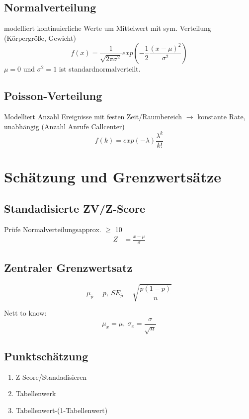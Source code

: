\documentclass[10pt,a4paper,landscape]{article}
\begin{document}
\begin{multicols}{4}
\subsection{Normalverteilung}
modelliert kontinuierliche Werte um Mittelwert mit sym. Verteilung (Körpergröße, Gewicht) \\

\[
f(x)=\frac{1}{\sqrt{2 \pi \sigma^2}}exp\left(-\frac{1}{2}\frac{(x-\mu)^2}{\sigma^2}\right)
\]
$\mu = 0$ und $\sigma^2 = 1$ ist standardnormalverteilt.


\subsection{Poisson-Verteilung}
Modelliert Anzahl Ereignisse mit festen Zeit/Raumbereich $\rightarrow$ konstante Rate, unabhängig (Anzahl Anrufe Callcenter)
\[
f(k)=exp(-\lambda)\frac{\lambda^k}{k!}
\]



\section{Schätzung und Grenzwertsätze}

\subsection{Standadisierte ZV/Z-Score}
Prüfe Normalverteilungsapprox. $\geq$ 10
\begin{align*}
Z &= \frac{x - \mu}{\sigma} 
\end{align*}


\subsection{Zentraler Grenzwertsatz}
\[
\mu_{\hat{p}}=p, ~SE_{\hat{p}}=\sqrt{\frac{p(1-p)}{n}}
\]

Nett to know:
\[
\mu_x = \mu, ~ \sigma_x = \frac{\sigma}{\sqrt{n}}
\]

\subsection{Punktschätzung}
\begin{enumerate}
\item Z-Score/Standadisieren
\item Tabellenwerk
\item Tabellenwert-(1-Tabellenwert)
\end{enumerate}


\end{multicols}
\end{document}
